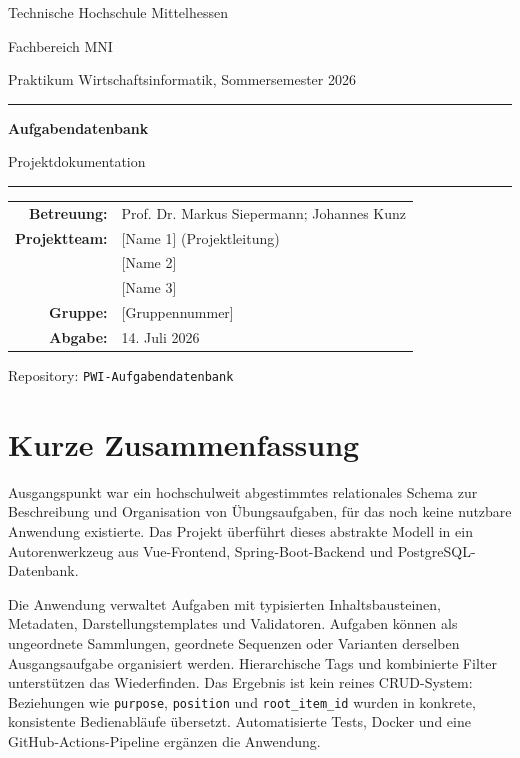 \documentclass[11pt,a4paper]{article}
\begin{document}
\begin{titlepage}\centering
\vspace*{2cm}
{\Large Technische Hochschule Mittelhessen\par}
{\large Fachbereich MNI\par}
{\large Praktikum Wirtschaftsinformatik, Sommersemester 2026\par}
\vspace{2.5cm}\rule{\linewidth}{.8pt}\par\vspace{.5cm}
{\Huge\bfseries Aufgabendatenbank\par}
{\LARGE Projektdokumentation\par}
\vspace{.5cm}\rule{\linewidth}{.8pt}\par\vspace{2cm}
\begin{tabular}{rl}
\textbf{Betreuung:} & Prof. Dr. Markus Siepermann; Johannes Kunz\\
\textbf{Projektteam:} & [Name 1] (Projektleitung)\\
& [Name 2]\\ & [Name 3]\\
\textbf{Gruppe:} & [Gruppennummer]\\
\textbf{Abgabe:} & 14. Juli 2026
\end{tabular}
\vfill{\small Repository: \texttt{PWI-Aufgabendatenbank}}
\end{titlepage}

\tableofcontents\newpage

\section{Kurze Zusammenfassung}
Ausgangspunkt war ein hochschulweit abgestimmtes relationales Schema zur
Beschreibung und Organisation von Übungsaufgaben, für das noch keine
nutzbare Anwendung existierte. Das Projekt überführt dieses abstrakte Modell
in ein Autorenwerkzeug aus Vue-Frontend, Spring-Boot-Backend und
PostgreSQL-Datenbank.

Die Anwendung verwaltet Aufgaben mit typisierten Inhaltsbausteinen,
Metadaten, Darstellungstemplates und Validatoren. Aufgaben können als
ungeordnete Sammlungen, geordnete Sequenzen oder Varianten derselben
Ausgangsaufgabe organisiert werden. Hierarchische Tags und kombinierte Filter
unterstützen das Wiederfinden. Das Ergebnis ist kein reines CRUD-System:
Beziehungen wie \texttt{purpose}, \texttt{position} und
\texttt{root\_item\_id} wurden in konkrete, konsistente Bedienabläufe
übersetzt. Automatisierte Tests, Docker und eine GitHub-Actions-Pipeline
ergänzen die Anwendung.
\end{document}
